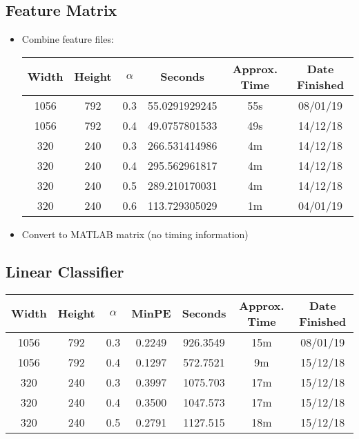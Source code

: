 \subsection{Feature Matrix}
\begin{itemize}
  \item Combine feature files:
  \begin{center}
  \begin{tabular}{ c c | c | c c c }
  Width & Height & $\alpha$ & Seconds & Approx. Time & Date Finished \\ \hline
  1056 & 792 & 0.3 & 55.0291929245 & 55s & 08/01/19 \\
  1056 & 792 & 0.4 & 49.0757801533 & 49s & 14/12/18 \\
  320 & 240 & 0.3 & 266.531414986 & 4m & 14/12/18 \\
  320 & 240 & 0.4 & 295.562961817 & 4m & 14/12/18 \\
  320 & 240 & 0.5 & 289.210170031 & 4m & 14/12/18 \\
  320 & 240 & 0.6 & 113.729305029 & 1m & 04/01/19 \\
  \end{tabular}
  \end{center}

  \item Convert to MATLAB matrix (no timing information)
\end{itemize}

\subsection{Linear Classifier}
  \begin{center}
  \begin{tabular}{ c c | c | c | c c c }
  Width & Height & $\alpha$ & MinPE & Seconds & Approx. Time & Date Finished \\ \hline
  1056 & 792 & 0.3 & 0.2249 & 926.3549 & 15m & 08/01/19 \\
  1056 & 792 & 0.4 & 0.1297 & 572.7521 & 9m & 15/12/18 \\
  320 & 240 & 0.3 & 0.3997 & 1075.703 & 17m & 15/12/18 \\
  320 & 240 & 0.4 & 0.3500 & 1047.573 & 17m & 15/12/18 \\
  320 & 240 & 0.5 & 0.2791 & 1127.515 & 18m & 15/12/18 \\
  \end{tabular}
  \end{center}
